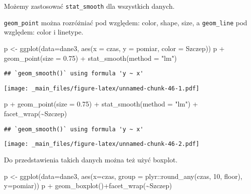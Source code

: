\documentclass[
]{book}
\newenvironment{Shaded}{\begin{snugshade}}{\end{snugshade}}
\newcommand{\AttributeTok}[1]{\textcolor[rgb]{0.77,0.63,0.00}{#1}}
\newcommand{\DecValTok}[1]{\textcolor[rgb]{0.00,0.00,0.81}{#1}}
\newcommand{\FloatTok}[1]{\textcolor[rgb]{0.00,0.00,0.81}{#1}}
\newcommand{\FunctionTok}[1]{\textcolor[rgb]{0.00,0.00,0.00}{#1}}
\newcommand{\NormalTok}[1]{#1}
\newcommand{\OtherTok}[1]{\textcolor[rgb]{0.56,0.35,0.01}{#1}}
\newcommand{\SpecialCharTok}[1]{\textcolor[rgb]{0.00,0.00,0.00}{#1}}
\newcommand{\StringTok}[1]{\textcolor[rgb]{0.31,0.60,0.02}{#1}}
\begin{document}
Możemy zastosować \texttt{stat\_smooth} dla wszystkich danych.

\texttt{geom\_point} można rozróżniać pod względem: color, shape, size, a \texttt{geom\_line} pod względem: color i linetype.

\begin{Shaded}
\begin{Highlighting}[]
\NormalTok{p }\OtherTok{\textless{}{-}} \FunctionTok{ggplot}\NormalTok{(}\AttributeTok{data=}\NormalTok{dane3, }\FunctionTok{aes}\NormalTok{(}\AttributeTok{x =}\NormalTok{ czas, }\AttributeTok{y =}\NormalTok{ pomiar, }\AttributeTok{color =}\NormalTok{ Szczep))}
\NormalTok{p }\SpecialCharTok{+} \FunctionTok{geom\_point}\NormalTok{(}\AttributeTok{size =} \FloatTok{0.75}\NormalTok{) }\SpecialCharTok{+} \FunctionTok{stat\_smooth}\NormalTok{(}\AttributeTok{method =} \StringTok{"lm"}\NormalTok{)}
\end{Highlighting}
\end{Shaded}

\begin{verbatim}
## `geom_smooth()` using formula 'y ~ x'
\end{verbatim}

\texttt{[image: \_main\_files/figure-latex/unnamed-chunk-46-1.pdf]}

\begin{Shaded}
\begin{Highlighting}[]
\NormalTok{p }\SpecialCharTok{+} \FunctionTok{geom\_point}\NormalTok{(}\AttributeTok{size =} \FloatTok{0.75}\NormalTok{) }\SpecialCharTok{+} \FunctionTok{stat\_smooth}\NormalTok{(}\AttributeTok{method =} \StringTok{"lm"}\NormalTok{) }\SpecialCharTok{+} \FunctionTok{facet\_wrap}\NormalTok{(}\SpecialCharTok{\textasciitilde{}}\NormalTok{Szczep)}
\end{Highlighting}
\end{Shaded}

\begin{verbatim}
## `geom_smooth()` using formula 'y ~ x'
\end{verbatim}

\texttt{[image: \_main\_files/figure-latex/unnamed-chunk-46-2.pdf]}

Do przedstawienia takich danych można też użyć boxplot.

\begin{Shaded}
\begin{Highlighting}[]
\NormalTok{p }\OtherTok{\textless{}{-}} \FunctionTok{ggplot}\NormalTok{(}\AttributeTok{data=}\NormalTok{dane3, }\FunctionTok{aes}\NormalTok{(}\AttributeTok{x=}\NormalTok{czas, }\AttributeTok{group =}\NormalTok{ plyr}\SpecialCharTok{::}\FunctionTok{round\_any}\NormalTok{(czas, }\DecValTok{10}\NormalTok{, floor), }\AttributeTok{y=}\NormalTok{pomiar))}
\NormalTok{p }\SpecialCharTok{+} \FunctionTok{geom\_boxplot}\NormalTok{()}\SpecialCharTok{+}\FunctionTok{facet\_wrap}\NormalTok{(}\SpecialCharTok{\textasciitilde{}}\NormalTok{Szczep)}
\end{Highlighting}
\end{Shaded}
\end{document}
